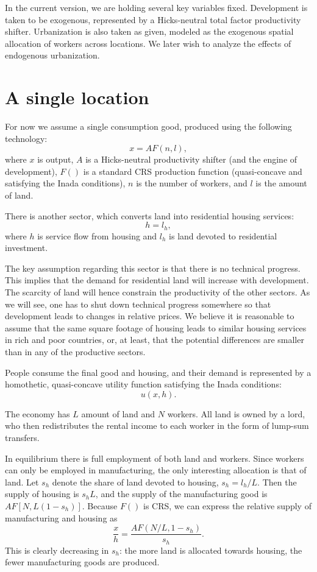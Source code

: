 \documentclass[12pt]{article}
\begin{document}
In the current version, we are holding several key variables fixed. Development is taken to be exogenous, represented by a Hicks-neutral total factor productivity shifter. Urbanization is also taken as given, modeled as the exogenous spatial allocation of workers across locations. We later wish to analyze the effects of endogenous urbanization.
\section{A single location}
For now we assume a single consumption good, produced using the following technology:
\[
x = AF(n,l),
\]
where $x$ is output, $A$ is a Hicks-neutral productivity shifter (and the engine of development), $F()$ is a standard CRS production function (quasi-concave and satisfying the Inada conditions), $n$ is the number of workers, and $l$ is the amount of land.

There is another sector, which converts land into residential housing services:
\[
h = l_h,
\]
where $h$ is service flow from housing and $l_h$ is land devoted to residential investment.

The key assumption regarding this sector is that there is no technical progress. This implies that the demand for residential land will increase with development. The scarcity of land will hence constrain the productivity of the other sectors. As we will see, one has to shut down technical progress somewhere so that development leads to changes in relative prices. We believe it is reasonable to assume that the same square footage of housing leads to similar housing services in rich and poor countries, or, at least, that the potential differences are smaller than in any of the productive sectors.

People consume the final good and housing, and their demand is represented by a homothetic, quasi-concave utility function satisfying the Inada conditions:
\[
u(x,h).
\]

The economy has $L$ amount of land and $N$ workers. All land is owned by a lord, who then redistributes the rental income to each worker in the form of lump-sum transfers.

In equilibrium there is full employment of both land and workers. Since workers can only be employed in manufacturing, the only interesting allocation is that of land. Let $s_h$ denote the share of land devoted to housing, $s_h = l_h/L$. Then the supply of housing is $s_h L$, and the supply of the manufacturing good is $AF[N,L(1-s_h)]$. Because $F()$ is CRS, we can express the relative supply of manufacturing and housing as
\[
\frac{x}{h} = \frac{AF(N/L,1-s_h)}{s_h}.
\]
This is clearly decreasing in $s_h$: the more land is allocated towards housing, the fewer manufacturing goods are produced.
\end{document}
